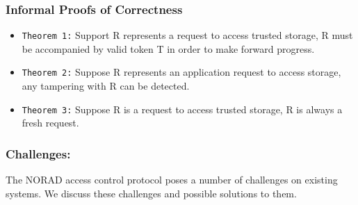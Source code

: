 \documentclass[withindex,glossary]{cam-thesis}
\begin{document}
\subsubsection{Informal Proofs of Correctness}
\begin{itemize}
\item \texttt{Theorem 1:} Support R represents a request to access trusted storage, R must be accompanied by valid token T in order to make forward progress. 

\item \texttt{Theorem 2:} Suppose R represents an application request to access storage, any tampering with R can be detected.

\item \texttt{Theorem 3:} Suppose R is a request to access trusted storage, R is always a fresh request.

\end {itemize}


\subsubsection{Challenges:}
The NORAD access control protocol poses a number of challenges on existing systems.
We discuss these challenges and possible solutions to them.
\end{document}
